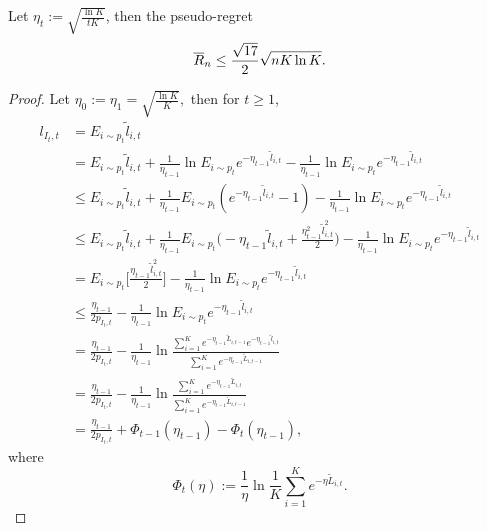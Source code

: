 \begin{thm}
    Let $\eta_t:=\sqrt{\frac{\ln K}{tK}}$, then the pseudo-regret
    \begin{equation}
        {\overline{R}}_n\le \frac{\sqrt{17}}{2}\sqrt{nK\ln K}.
    \end{equation}
\end{thm}
\begin{proof}
    Let $\eta_0:=\eta_1=\sqrt{\frac{\ln K}{K}},$
    then for $t\ge1$,
    \begin{align}
        l_{I_t,t}
            &= E_{i\sim p_t}\tilde l_{i,t} \\
            &= E_{i\sim p_t}\tilde l_{i,t}
                +\frac{1}{\eta_{t-1}}\ln E_{i\sim p_t}e^{-\eta_{t-1}\tilde l_{i,t}}
                -\frac{1}{\eta_{t-1}}\ln E_{i\sim p_t}e^{-\eta_{t-1}\tilde l_{i,t}}\\
            &\le  E_{i\sim p_t}\tilde l_{i,t}
                +\frac{1}{\eta_{t-1}} E_{i\sim p_t}(e^{-\eta_{t-1}\tilde l_{i,t}} - 1)
                -\frac{1}{\eta_{t-1}}\ln E_{i\sim p_t}e^{-\eta_{t-1}\tilde l_{i,t}}\\
            &\le E_{i\sim p_t}\tilde l_{i,t}
                +\frac{1}{\eta_{t-1}} E_{i\sim p_t}\bigg(-\eta_{t-1}\tilde l_{i,t}+\frac{\eta_{t-1}^2\tilde l_{i,t}^2}{2}\bigg)
                -\frac{1}{\eta_{t-1}}\ln E_{i\sim p_t}e^{-\eta_{t-1}\tilde l_{i,t}}\\
            &= E_{i\sim p_t}\bigg[\frac{\eta_{t-1}\tilde l_{i,t}^2}{2}\bigg]
                -\frac{1}{\eta_{t-1}}\ln E_{i\sim p_t}e^{-\eta_{t-1}\tilde l_{i,t}}\\
            &\le \frac{\eta_{t-1}}{2p_{I_t,t}}
                -\frac{1}{\eta_{t-1}}\ln E_{i\sim p_t}e^{-\eta_{t-1}\tilde l_{i,t}}\\
            &= \frac{\eta_{t-1}}{2p_{I_t,t}}
                -\frac{1}{\eta_{t-1}}\ln \frac{\sum_{i=1}^K e^{-\eta_{t-1}\tilde L_{i,t-1}}e^{-\eta_{t-1}\tilde l_{i,t}}}{\sum_{i=1}^K e^{-\eta_{t-1}\tilde L_{i,t-1}}} \\
            &= \frac{\eta_{t-1}}{2p_{I_t,t}}
                -\frac{1}{\eta_{t-1}}\ln \frac{\sum_{i=1}^K e^{-\eta_{t-1}\tilde L_{i,t}}}{\sum_{i=1}^K e^{-\eta_{t-1}\tilde L_{i,t-1}}} \\
            &= \frac{\eta_{t-1}}{2p_{I_t,t}} + \Phi_{t-1}(\eta_{t-1}) - \Phi_t(\eta_{t-1}),
    \end{align}
    where
    \begin{equation}
        \Phi_t(\eta):= \frac{1}{\eta}\ln\frac{1}{K} \sum_{i=1}^K e^{-\eta\tilde L_{i,t}}.

\end{equation}
\end{proof}
